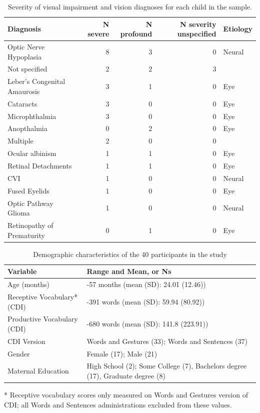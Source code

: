 \documentclass[english,man,floatsintext]{apa6}
\begin{document}
\begin{table}[H]

\caption{\label{tab:diagnosis-table}Severity of visual impairment and vision diagnoses for each child in the sample.}
\centering
\begin{tabular}[t]{l|r|r|r|l}
\hline
Diagnosis & N severe & N profound & N severity unspecified & Etiology\\
\hline
Optic Nerve Hypoplasia & 8 & 3 & 0 & Neural\\
\hline
Not specified & 2 & 2 & 3 & \\
\hline
Leber's Congenital Amaurosis & 3 & 1 & 0 & Eye\\
\hline
Cataracts & 3 & 0 & 0 & Eye\\
\hline
Microphthalmia & 3 & 0 & 0 & Eye\\
\hline
Anopthalmia & 0 & 2 & 0 & Eye\\
\hline
Multiple & 2 & 0 & 0 & \\
\hline
Ocular albinism & 1 & 1 & 0 & Eye\\
\hline
Retinal Detachments & 1 & 1 & 0 & Eye\\
\hline
CVI & 1 & 0 & 0 & Neural\\
\hline
Fused Eyelids & 1 & 0 & 0 & Eye\\
\hline
Optic Pathway Glioma & 1 & 0 & 0 & Neural\\
\hline
Retinopathy of Prematurity & 0 & 1 & 0 & Eye\\
\hline
\end{tabular}
\end{table}

\begin{table}[H]

\begin{threeparttable}
\caption{\label{tab:demographics-table}Demographic characteristics of the 40 participants in the study}
\centering
\begin{tabular}[t]{l|>{\raggedright\arraybackslash}p{4in}}
\hline
Variable & Range and Mean, or Ns\\
\hline
Age (months) & 7-57 months (mean (SD): 24.01 (12.46))\\
\hline
Receptive Vocabulary* (CDI) & 0-391 words (mean (SD): 59.94 (80.92))\\
\hline
Productive Vocabulary (CDI) & 0-680 words (mean (SD): 141.8 (223.91))\\
\hline
CDI Version & Words and Gestures (33); Words and Sentences (37)\\
\hline
Gender & Female (17); Male (21)\\
\hline
Maternal Education & High School (2); Some College (7), Bachelors degree (17), Graduate degree (8)\\
\hline
\end{tabular}
\begin{tablenotes}
\small
\item [*] Receptive vocabulary scores only measured on Words and Gestures version of CDI; all Words and Sentences administrations excluded from these values.
\end{tablenotes}
\end{threeparttable}
\end{table}
\end{document}

